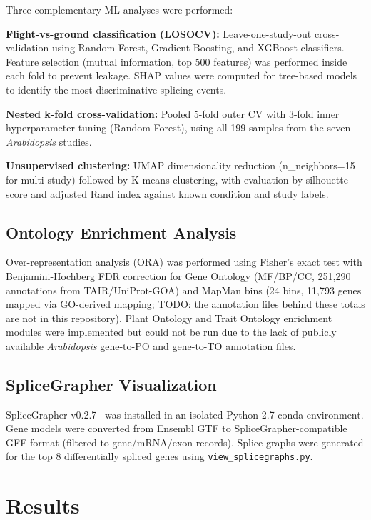 \documentclass[12pt,a4paper]{article}
\begin{document}
Three complementary ML analyses were performed:

\textbf{Flight-vs-ground classification (LOSOCV):} Leave-one-study-out cross-validation using Random Forest, Gradient Boosting, and XGBoost classifiers. Feature selection (mutual information, top 500 features) was performed inside each fold to prevent leakage. SHAP values were computed for tree-based models to identify the most discriminative splicing events.

\textbf{Nested k-fold cross-validation:} Pooled 5-fold outer CV with 3-fold inner hyperparameter tuning (Random Forest), using all 199 samples from the seven \textit{Arabidopsis} studies.

\textbf{Unsupervised clustering:} UMAP dimensionality reduction (n\_neighbors=15 for multi-study) followed by K-means clustering, with evaluation by silhouette score and adjusted Rand index against known condition and study labels.

\subsection{Ontology Enrichment Analysis}

Over-representation analysis (ORA) was performed using Fisher's exact test with Benjamini-Hochberg FDR correction for Gene Ontology (MF/BP/CC, 251,290 annotations from TAIR/UniProt-GOA) and MapMan bins (24 bins, 11,793 genes mapped via GO-derived mapping; TODO: the annotation files behind these totals are not in this repository). Plant Ontology and Trait Ontology enrichment modules were implemented but could not be run due to the lack of publicly available \textit{Arabidopsis} gene-to-PO and gene-to-TO annotation files.

\subsection{SpliceGrapher Visualization}

SpliceGrapher v0.2.7~\cite{splicegrapher} was installed in an isolated Python 2.7 conda environment. Gene models were converted from Ensembl GTF to SpliceGrapher-compatible GFF format (filtered to gene/mRNA/exon records). Splice graphs were generated for the top 8 differentially spliced genes using \texttt{view\_splicegraphs.py}.

\section{Results}
\end{document}

